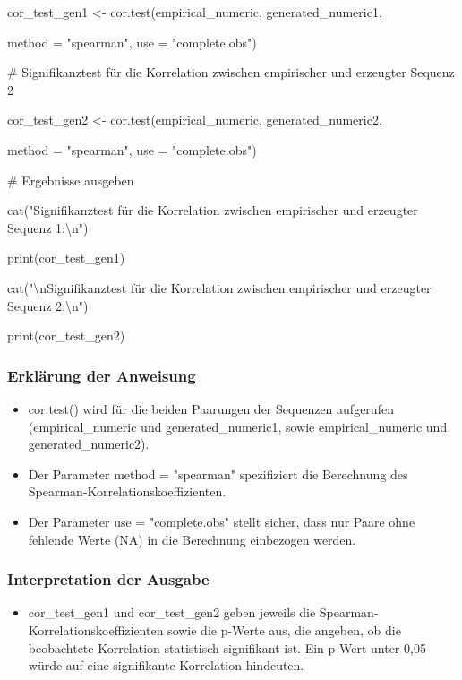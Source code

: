 \documentclass[
]{article}
\begin{document}
cor\_test\_gen1 \textless- cor.test(empirical\_numeric,
generated\_numeric1,

method = "spearman", use = "complete.obs")

\# Signifikanztest für die Korrelation zwischen empirischer und
erzeugter Sequenz 2

cor\_test\_gen2 \textless- cor.test(empirical\_numeric,
generated\_numeric2,

method = "spearman", use = "complete.obs")

\# Ergebnisse ausgeben

cat("Signifikanztest für die Korrelation zwischen empirischer und
erzeugter Sequenz 1:\textbackslash n")

print(cor\_test\_gen1)

cat("\textbackslash nSignifikanztest für die Korrelation zwischen
empirischer und erzeugter Sequenz 2:\textbackslash n")

print(cor\_test\_gen2)

\subsubsection{\texorpdfstring{\textbf{Erklärung der
Anweisung}}{Erklärung der Anweisung}}\label{erkluxe4rung-der-anweisung}

\begin{itemize}
\item
  cor.test() wird für die beiden Paarungen der Sequenzen aufgerufen
  (empirical\_numeric und generated\_numeric1, sowie empirical\_numeric
  und generated\_numeric2).
\item
  Der Parameter method = "spearman" spezifiziert die Berechnung des
  Spearman-Korrelationskoeffizienten.
\item
  Der Parameter use = "complete.obs" stellt sicher, dass nur Paare ohne
  fehlende Werte (NA) in die Berechnung einbezogen werden.
\end{itemize}

\subsubsection{\texorpdfstring{\textbf{Interpretation der
Ausgabe}}{Interpretation der Ausgabe}}\label{interpretation-der-ausgabe}

\begin{itemize}
\item
  cor\_test\_gen1 und cor\_test\_gen2 geben jeweils die
  Spearman-Korrelationskoeffizienten sowie die p-Werte aus, die angeben,
  ob die beobachtete Korrelation statistisch signifikant ist. Ein p-Wert
  unter 0,05 würde auf eine signifikante Korrelation hindeuten.
\end{itemize}
\end{document}
